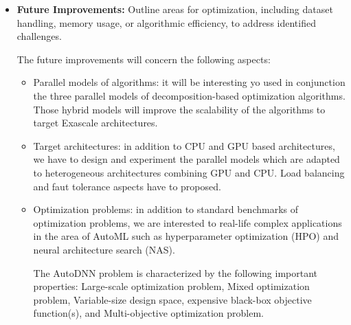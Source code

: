 \begin{itemize}
\item \textbf{Future Improvements:} Outline areas for optimization, including dataset handling, memory usage, or algorithmic efficiency, to address identified challenges.

The future improvements will concern the following aspects:
\begin{itemize}
\item Parallel models of algorithms: it will be interesting yo used in conjunction the three parallel models of decomposition-based optimization algorithms. Those hybrid models will improve the scalability of the algorithms to target Exascale architectures.

\item Target architectures: in addition to CPU and GPU based architectures, we have to design and experiment the parallel models which are adapted to heterogeneous architectures combining GPU and CPU. Load balancing and faut tolerance aspects have to proposed.

\item Optimization problems: in addition to standard benchmarks of optimization problems, we are interested to real-life complex applications in the area of AutoML such as hyperparameter optimization (HPO) and neural architecture search (NAS).

The AutoDNN problem is characterized by the following important properties: Large-scale optimization problem, Mixed optimization problem, Variable-size design space, expensive black-box objective function(s), and Multi-objective optimization problem.

\end{itemize}

\end{itemize}

